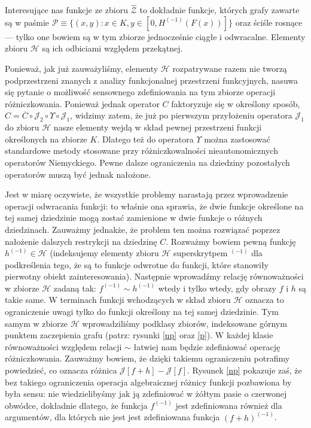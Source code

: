  Interesujące nas funkcje ze zbioru $\hat{\mathcal{Z}}$ to dokładnie funkcje, których grafy zawarte są w paśmie $\mathcal{P} \equiv \{ (x,y): x \in K, y \in [0,H^{(-1)}(F(x))]\}$ oraz ściśle rosnące --- tylko one bowiem są w tym zbiorze jednocześnie ciągłe i odwracalne. Elementy zbioru $\mathcal{H}$ są ich odbiciami względem przekątnej. 
 
 	Ponieważ, jak już zauważyliśmy, elementy $\mathcal{H}$ rozpatrywane razem nie tworzą podprzestrzeni znanych z analizy funkcjonalnej przestrzeni funkcyjnych, nasuwa się pytanie o możliwość sensownego zdefiniowania na tym zbiorze operacji różniczkowania. Ponieważ jednak operator $C$ faktoryzuje się w określony sposób, $C = \overline{C} \circ \mathcal{J}_2 \circ \Upsilon \circ \mathcal{J}_1 $, widzimy zatem, że już po pierwszym przyłożeniu operatora $\mathcal{J}_1$ do zbioru $\mathcal{H}$ nasze elementy wejdą w skład pewnej przestrzeni funkcji określonych na zbiorze $K$. Dlatego też do operatora $\Upsilon$ można zastosować standardowe metody stosowane przy różniczkowalności nieautonomicznych operatorów Niemyckiego. Pewne dalsze ograniczenia na dziedziny pozostałych operatorów muszą być jednak nałożone. 
 	
 	Jest w miarę oczywiste, że wszystkie problemy narastają przez wprowadzenie operacji odwracania funkcji: to właśnie ona sprawia, że dwie funkcje określone na tej samej dziedzinie mogą zostać zamienione w dwie funkcje o różnych dziedzinach. Zauważmy jednakże, że problem ten można rozwiązać poprzez nałożenie dalszych restrykcji na dziedzinę $C$. Rozważmy bowiem pewną funkcję $h^{(-1)} \in \mathcal{H}$ (indeksujemy elementy zbioru $\mathcal{H}$ superskrytpem $^{(-1)}$ dla podkreślenia tego, że są to funkcje odwrotne do funkcji, które stanowiły pierwotny obiekt zainteresowania). Następnie wprowadźmy relację równoważności w zbiorze $\mathcal{H}$ zadaną tak: $f^{(-1)} \sim h^{(-1)}$ wtedy i tylko wtedy, gdy obrazy $f$ i $h$ są takie same. W terminach funkcji  wchodzących w skład zbioru $\mathcal{H}$ oznacza to ograniczenie uwagi tylko do funkcji określony na tej samej dziedzinie. Tym samym w zbiorze $\mathcal{H}$ wprowadziliśmy podklasy zbiorów, indeksowane górnym punktem zaczepienia grafu (patrz: rysunki \ref{np} oraz \ref{p}). W każdej klasie równoważności względem relacji $\sim$ łatwiej nam będzie zdefiniować operację różniczkowania. Zauważmy bowiem, że dzięki takiemu ograniczeniu potrafimy powiedzieć, co oznacza różnica $\mathcal{J}[f+h]-\mathcal{J}[f]$. Rysunek \ref{np} pokazuje zaś, że bez takiego ograniczenia operacja algebraicznej różnicy funkcji pozbawiona by była sensu: nie wiedzielibyśmy jak ją zdefiniować w żółtym pasie o czerwonej obwódce, dokładnie dlatego, że funkcja $f^{(-1)}$ jest zdefiniowana również dla argumentów, dla których nie jest jest zdefiniowana funkcja $(f+h)^{(-1)}$. 

